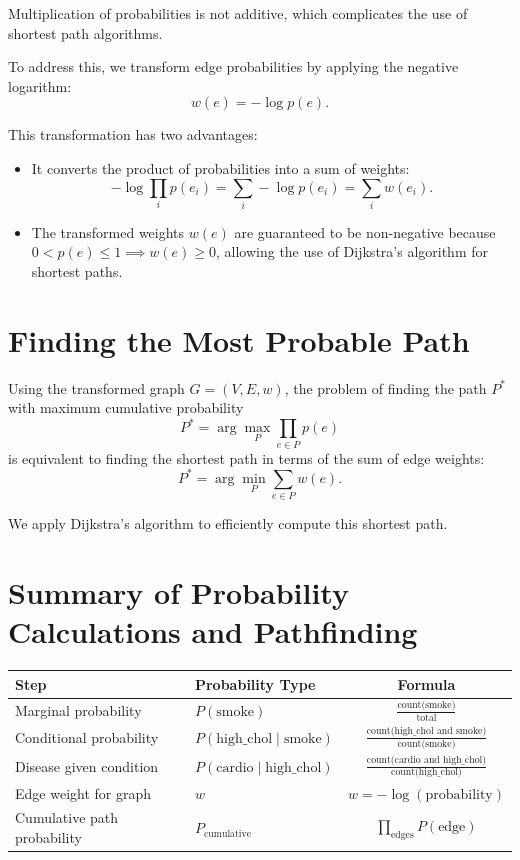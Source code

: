 \documentclass[11pt]{article}
\begin{document}
Multiplication of probabilities is not additive, which complicates the use of shortest path algorithms.

To address this, we transform edge probabilities by applying the negative logarithm:
\[
w(e) = -\log p(e).
\]

This transformation has two advantages:
\begin{itemize}
    \item It converts the product of probabilities into a sum of weights:
    \[
    -\log \prod_{i} p(e_i) = \sum_i -\log p(e_i) = \sum_i w(e_i).
    \]
    \item The transformed weights \(w(e)\) are guaranteed to be non-negative because \(0 < p(e) \leq 1 \implies w(e) \geq 0\), allowing the use of Dijkstra’s algorithm for shortest paths.
\end{itemize}

\section{Finding the Most Probable Path}

Using the transformed graph \(G = (V,E,w)\), the problem of finding the path \(P^*\) with maximum cumulative probability
\[
P^* = \arg\max_P \prod_{e \in P} p(e)
\]
is equivalent to finding the shortest path in terms of the sum of edge weights:
\[
P^* = \arg\min_P \sum_{e \in P} w(e).
\]

We apply Dijkstra’s algorithm to efficiently compute this shortest path.

\section{Summary of Probability Calculations and Pathfinding}

\begin{center}
\begin{tabular}{llc}
\hline
\textbf{Step} & \textbf{Probability Type} & \textbf{Formula} \\
\hline
Marginal probability & \(P(\text{smoke})\) & \(\frac{\text{count(smoke)}}{\text{total}}\) \\
Conditional probability & \(P(\text{high\_chol} \mid \text{smoke})\) & \(\frac{\text{count(high\_chol and smoke)}}{\text{count(smoke)}}\) \\
Disease given condition & \(P(\text{cardio} \mid \text{high\_chol})\) & \(\frac{\text{count(cardio and high\_chol)}}{\text{count(high\_chol)}}\) \\
Edge weight for graph & \(w\) & \(w = -\log(\text{probability})\) \\
Cumulative path probability & \(P_{\text{cumulative}}\) & \(\prod_{\text{edges}} P(\text{edge})\) \\
\hline
\end{tabular}
\end{center}
\end{document}
